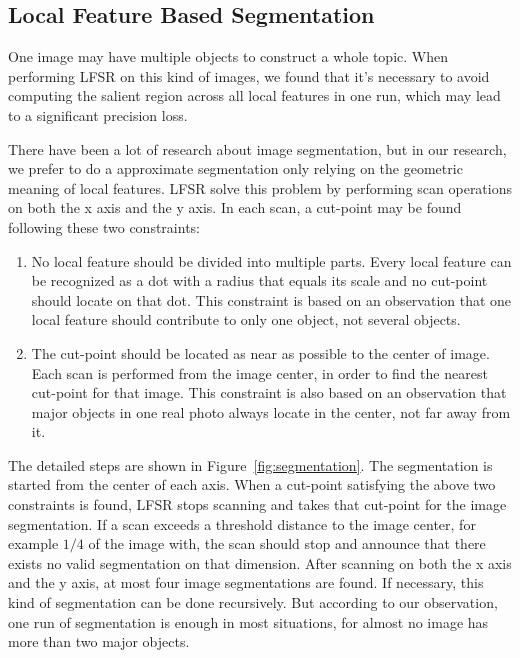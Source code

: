 \subsection{Local Feature Based Segmentation}
\label{sec:algorithm_segmentation}

One image may have multiple objects to construct a whole topic. When performing LFSR on this kind of images, we found that it's necessary to avoid computing the salient region across all local features in one run, which may lead to a significant precision loss.

There have been a lot of research about image segmentation, but in our research, we prefer to do a approximate segmentation only relying on the geometric meaning of local features. LFSR solve this problem by performing scan operations on both the x axis and the y axis. In each scan, a cut-point may be found following these two constraints:

\begin{enumerate}

  \item No local feature should be divided into multiple parts. Every local feature can be recognized as a dot with a radius that equals its scale and no cut-point should locate on that dot. This constraint is based on an observation that one local feature should contribute to only one object, not several objects.

  \item The cut-point should be located as near as possible to the center of image. Each scan is performed from the image center, in order to find the nearest cut-point for that image. This constraint is also based on an observation that major objects in one real photo always locate in the center, not far away from it.

\end{enumerate}

The detailed steps are shown in Figure~\ref{fig:segmentation}. The segmentation is started from the center of each axis. When a cut-point satisfying the above two constraints is found, LFSR stops scanning and takes that cut-point for the image segmentation. If a scan exceeds a threshold distance to the image center, for example $1/4$ of the image with, the scan should stop and announce that there exists no valid segmentation on that dimension. After scanning on both the x axis and the y axis, at most four image segmentations are found. If necessary, this kind of segmentation can be done recursively. But according to our observation, one run of segmentation is enough in most situations, for almost no image has more than two major objects.

